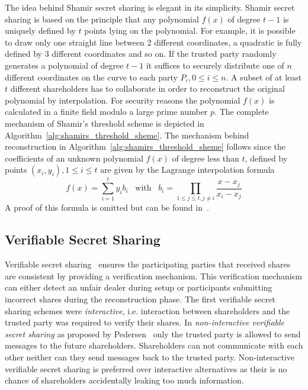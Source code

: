 The idea behind Shamir secret sharing is elegant in its simplicity. Shamir secret sharing is based on the principle that any polynomial $f \left( x \right)$ of degree $t-1$ is uniquely defined by $t$ points lying on the polynomial. For example, it is possible to draw only one straight line between 2 different coordinates, a quadratic is fully defined by 3 different coordinates and so on. If the trusted party randomly generates a polynomial of degree $t-1$ it suffices to securely distribute one of $n$ different coordinates on the curve to each party $P_i, 0 \leq i \leq n$. A subset of at least $t$ different shareholders has to collaborate in order to reconstruct the original polynomial by interpolation. For security reasons the polynomial $f \left( x \right)$ is calculated in a finite field modulo a large prime number $p$. The complete mechanism of Shamir's threshold scheme is depicted in Algorithm~\ref{alg:shamirs_threshold_sheme}. The mechanism behind reconstruction in Algorithm~\ref{alg:shamirs_threshold_sheme} follows since the coefficients of an unknown polynomial $f \left( x \right)$ of degree less than $t$, defined by points $\left( x_i, y_i \right), 1 \leq i \leq t$ are given by the Lagrange interpolation formula
\begin{equation*}
 f \left( x \right) = \sum^t_{i=1}y_i b_i \; \; \; \textrm{with} \; \; \; b_i = \prod_{1 \leq j \leq t, j \neq i} \frac{x-x_j}{x_i-x_j}
\end{equation*}
A proof of this formula is omitted but can be found in~\cite{site:proofwiki_lagrange}.

\subsection{Verifiable Secret Sharing}
Verifiable secret sharing~\cite{art:ChorGMA85} ensures the participating parties that received shares are consistent by providing a verification mechanism. This verification mechanism can either detect an unfair dealer during setup or participants submitting incorrect shares during the reconstruction phase. The first verifiable secret sharing schemes were \textit{interactive}, i.e. interaction between shareholders and the trusted party was required to verify their shares. In \textit{non-interactive verifiable secret sharing} as proposed by Pedersen~\cite{art:Pedersen91} only the trusted party is allowed to send messages to the future shareholders. Shareholders can not communicate with each other neither can they send messages back to the trusted party. Non-interactive verifiable secret sharing is preferred over interactive alternatives as their is no chance of shareholders accidentally leaking too much information.

